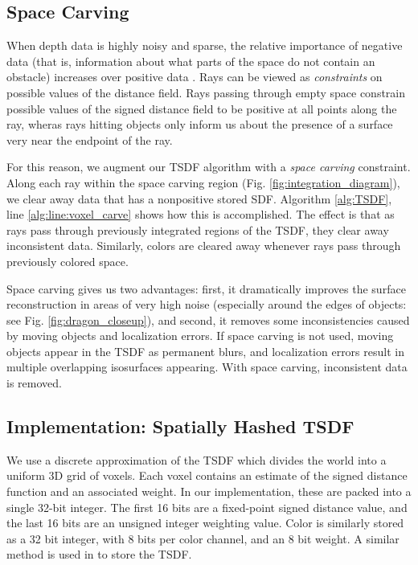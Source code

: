 \documentclass[10pt,twocolumn,letterpaper]{article}
\begin{document}
\subsection{Space Carving}
\label{section:carving}
When depth data is highly noisy and sparse, the relative importance of negative
data (that is, information about what parts of the space do not contain an
obstacle) increases over positive data \cite{Klingensmith2014}. Rays can be
viewed as \textit{constraints} on possible values of the distance field. Rays
passing through empty space constrain possible values of the signed distance
field to be positive at all points along the ray, wheras rays hitting objects 
only inform us about the presence of a surface very near the endpoint of the ray.

For this reason, we augment our TSDF algorithm with a \textit{space carving}
constraint. Along each ray within the space carving region (Fig.
\ref{fig:integration_diagram}), we clear away data that has a nonpositive stored
SDF. Algorithm \ref{alg:TSDF}, line \ref{alg:line:voxel_carve} shows how this is
accomplished. The effect is that as rays pass through previously integrated
regions of the TSDF, they clear away inconsistent data. Similarly, colors are
cleared away whenever rays pass through previously colored space.

Space carving gives us two advantages: first, it dramatically improves the
surface reconstruction in areas of very high noise (especially around the edges
of objects: see Fig. \ref{fig:dragon_closeup}), and second, it removes
some inconsistencies caused by moving objects and localization errors. If space
carving is not used, moving objects appear in the TSDF as permanent blurs, and
localization errors result in multiple overlapping isosurfaces appearing. With
space carving, inconsistent data is removed.

\subsection{Implementation: Spatially Hashed TSDF}
We use a discrete approximation of the TSDF which divides the world into
a uniform 3D grid of voxels. Each voxel contains an estimate of the signed
distance function and an associated weight. In our implementation, these are
packed into a single 32-bit integer. The first 16 bits are a fixed-point
signed distance value, and the last 16 bits  are an unsigned integer weighting
value. Color is similarly stored as a 32 bit integer, with 8 bits per color 
channel, and an 8 bit weight. A similar method is used in \cite{Newcombe,
Whelan2013, Bylow2013} to store the TSDF.
\end{document}

